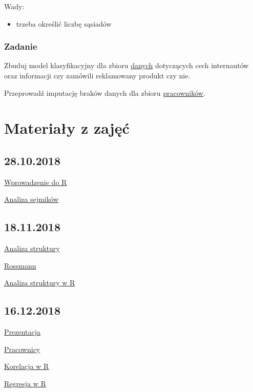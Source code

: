 \documentclass[]{book}
\providecommand{\tightlist}{%
  \setlength{\itemsep}{0pt}\setlength{\parskip}{0pt}}
\begin{document}
Wady:

\begin{itemize}
\tightlist
\item
  trzeba określić liczbę sąsiadów
\end{itemize}

\subsection{Zadanie}\label{zadanie-4}

Zbuduj model klasyfikacyjny dla zbioru
\href{data/Social_Network_Ads.csv}{danych} dotyczących cech internautów
oraz informacji czy zamówili reklamowany produkt czy nie.

Przeprowadź imputację braków danych dla zbioru
\href{data/pracownicy.RData}{pracowników}.

\chapter{Materiały z zajęć}\label{materiay-z-zajec}

\section{28.10.2018}\label{section}

\href{res/skrypt20181028.R}{Wprowadzenie do R}

\href{res/analiza20181028.R}{Analiza sejmików}

\section{18.11.2018}\label{section-1}

\href{https://departmentofstatisticspue.github.io/statystyka-opisowa/analiza-struktury.html}{Analiza
struktury}

\href{data/rossmann.xlsx}{Rossmann}

\href{res/zajecia20181118.R}{Analiza struktury w R}

\section{16.12.2018}\label{section-2}

\href{prezentacje/03.html}{Prezentacja}

\href{data/Salary_Data.csv}{Pracownicy}

\href{res/korelacje20181216.R}{Korelacja w R}

\href{res/regresja20181216.Rmd}{Regresja w R}
\end{document}
